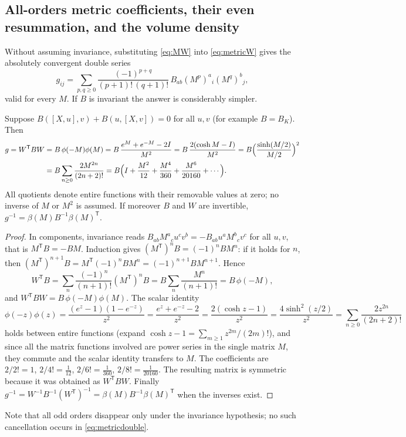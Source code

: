 \subsection{All-orders metric coefficients, their even resummation, and the volume density}
Without assuming invariance, substituting \eqref{eq:MW} into
\eqref{eq:metricW} gives the absolutely convergent double series
\begin{equation}\label{eq:metricdouble}
 g_{ij}=\sum_{p,q\geq0}\frac{(-1)^{p+q}}{(p+1)!\,(q+1)!}\,B_{ab}(M^p)^a{}_i(M^q)^b{}_j,
\end{equation}
valid for every $M$. If $B$ is invariant the answer is considerably
simpler.
\begin{theorem}\label{thm:metric}
Suppose $B([X,u],v)+B(u,[X,v])=0$ for all $u,v$ (for example $B=B_K$).
Then
\begin{align}
 g=W^{\mathsf T}BW&=B\,\phi(-M)\phi(M)
 =B\,\frac{e^M+e^{-M}-2I}{M^2}
 =B\,\frac{2(\cosh M-I)}{M^2}
 =B\Bigl(\frac{\sinh(M/2)}{M/2}\Bigr)^2\label{eq:metricclosed}\\
 &=B\sum_{n\geq0}\frac{2M^{2n}}{(2n+2)!}
 =B\Bigl(I+\frac{M^2}{12}+\frac{M^4}{360}+\frac{M^6}{20160}+\cdots\Bigr).
 \label{eq:metriceven}
\end{align}
All quotients denote entire functions with their removable values at
zero; no inverse of $M$ or $M^2$ is assumed. If moreover $B$ and $W$ are
invertible, $g^{-1}=\beta(M)B^{-1}\beta(M)^{\mathsf T}$.
\end{theorem}
\begin{proof}
In components, invariance reads $B_{ab}M^a{}_cu^cv^b=-B_{ab}u^aM^b{}_cv^c$
for all $u,v$, that is $M^{\mathsf T}B=-BM$. Induction gives
$(M^{\mathsf T})^nB=(-1)^nBM^n$: if it holds for $n$, then
$(M^{\mathsf T})^{n+1}B=M^{\mathsf T}(-1)^nBM^n=(-1)^{n+1}BM^{n+1}$. Hence
\[
 W^{\mathsf T}B=\sum_n\frac{(-1)^n}{(n+1)!}(M^{\mathsf T})^nB
 =B\sum_n\frac{M^n}{(n+1)!}=B\,\phi(-M),
\]
and $W^{\mathsf T}BW=B\,\phi(-M)\phi(M)$. The scalar identity
\[
 \phi(-z)\phi(z)=\frac{(e^z-1)(1-e^{-z})}{z^2}=\frac{e^z+e^{-z}-2}{z^2}
 =\frac{2(\cosh z-1)}{z^2}=\frac{4\sinh^2(z/2)}{z^2}
 =\sum_{n\geq0}\frac{2z^{2n}}{(2n+2)!}
\]
holds between entire functions (expand $\cosh z-1=\sum_{m\geq1}z^{2m}/(2m)!$),
and since all the matrix functions involved are power series in the single
matrix $M$, they commute and the scalar identity transfers to $M$. The
coefficients are $2/2!=1$, $2/4!=\tfrac1{12}$, $2/6!=\tfrac1{360}$,
$2/8!=\tfrac1{20160}$. The resulting matrix is symmetric because it was
obtained as $W^{\mathsf T}BW$. Finally
$g^{-1}=W^{-1}B^{-1}(W^{\mathsf T})^{-1}=\beta(M)B^{-1}\beta(M)^{\mathsf T}$
when the inverses exist.
\end{proof}
Note that all odd orders disappear only under the invariance hypothesis;
no such cancellation occurs in \eqref{eq:metricdouble}.

